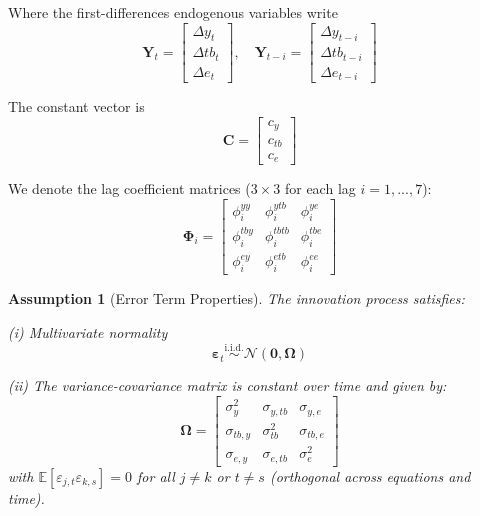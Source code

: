 \documentclass[
]{article}
\newtheorem{assumption}{Assumption} %
\begin{document}
	Where the first-differences endogenous variables write
	\begin{equation*}
		\bm{Y}_t = \begin{bmatrix} 
			\Delta y_t \\ 
			\Delta tb_t \\ 
			\Delta e_t 
		\end{bmatrix}, \quad
		\bm{Y}_{t-i} = \begin{bmatrix} 
			\Delta y_{t-i} \\ 
			\Delta tb_{t-i} \\ 
			\Delta e_{t-i} 
		\end{bmatrix}
	\end{equation*}
	
	The constant vector is 
	\begin{equation*}
		\bm{C} = \begin{bmatrix} 
			c_y \\ 
			c_{tb} \\ 
			c_e 
		\end{bmatrix}
	\end{equation*}
	
	We denote the lag coefficient matrices ($3 \times 3$ for each lag $i=1,...,7$):
	\begin{equation*}
		\bm{\Phi}_i = \begin{bmatrix}
			\phi^{yy}_i & \phi^{ytb}_i & \phi^{ye}_i \\
			\phi^{tby}_i & \phi^{tbtb}_i & \phi^{tbe}_i \\
			\phi^{ey}_i & \phi^{etb}_i & \phi^{ee}_i
		\end{bmatrix}
	\end{equation*}
	
	\begin{assumption}[Error Term Properties]\label{assump:errors}
		The innovation process satisfies:
		
		(i) Multivariate normality 
		\begin{equation*}
			\bm{\varepsilon}_t \overset{\text{i.i.d.}}{\sim} \mathcal{N}\left( \bm{0}, \bm{\Omega} \right)
		\end{equation*}
		
		(ii) The variance-covariance matrix is constant over time and given by:
		\begin{equation}\label{eq:omega}
			\bm{\Omega} = \begin{bmatrix}
				\sigma^2_y & \sigma_{y,tb} & \sigma_{y,e} \\
				\sigma_{tb,y} & \sigma^2_{tb} & \sigma_{tb,e} \\
				\sigma_{e,y} & \sigma_{e,tb} & \sigma^2_e
			\end{bmatrix}
		\end{equation}
		with $\mathbb{E}[\varepsilon_{j,t}\varepsilon_{k,s}] = 0$ for all $j \neq k$ or $t \neq s$ (orthogonal across equations and time).
	\end{assumption}
	
\end{document}
